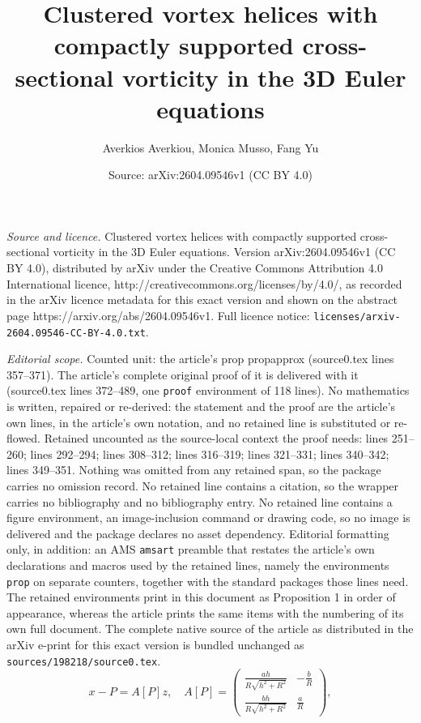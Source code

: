 \documentclass[10pt,a4paper]{amsart}
\title{Clustered vortex helices with compactly supported cross-sectional vorticity in the 3D Euler equations}
\author{Averkios Averkiou, Monica Musso, Fang Yu}
\date{Source: arXiv:2604.09546v1 (CC BY 4.0)}
\begin{document}
\maketitle

\noindent\emph{Source and licence.} Clustered vortex helices with compactly supported cross-sectional vorticity in the 3D Euler equations. Version arXiv:2604.09546v1 (CC BY 4.0), distributed by arXiv under the Creative Commons Attribution 4.0 International licence, http://creativecommons.org/licenses/by/4.0/, as recorded in the arXiv licence metadata for this exact version and shown on the abstract page https://arxiv.org/abs/2604.09546v1. Full licence notice: \texttt{licenses/arxiv-2604.09546-CC-BY-4.0.txt}.\par\smallskip

\noindent\textit{Editorial scope.} Counted unit: the article's prop propapprox (source0.tex lines 357--371). The article's complete original proof of it is delivered with it (source0.tex lines 372--489, one \texttt{proof} environment of 118 lines). No mathematics is written, repaired or re-derived: the statement and the proof are the article's own lines, in the article's own notation, and no retained line is substituted or re-flowed.  Retained uncounted as the source-local context the proof needs: lines 251--260; lines 292--294; lines 308--312; lines 316--319; lines 321--331; lines 340--342; lines 349--351.  Nothing was omitted from any retained span, so the package carries no omission record.  No retained line contains a citation, so the wrapper carries no bibliography and no bibliography entry.  No retained line contains a figure environment, an image-inclusion command or drawing code, so no image is delivered and the package declares no asset dependency.  Editorial formatting only, in addition: an AMS \texttt{amsart} preamble that restates the article's own declarations and macros used by the retained lines, namely the environments \texttt{prop} on separate counters, together with the standard packages those lines need.  The retained environments print in this document as Proposition 1 in order of appearance, whereas the article prints the same items with the numbering of its own full document.  The complete native source of the article as distributed in the arXiv e-print for this exact version is bundled unchanged as \texttt{sources/198218/source0.tex}.
\begin{equation}\label{var}
x-P=A[P]z,\quad
A[P]=
\begin{pmatrix}
\frac{ah}{R\sqrt{h^2+R^2}}
& -\frac{b}{R}\\
\frac{bh}{R\sqrt{h^2+R^2}}
& \frac{a}{R}
\end{pmatrix},
\end{equation}
\end{document}
